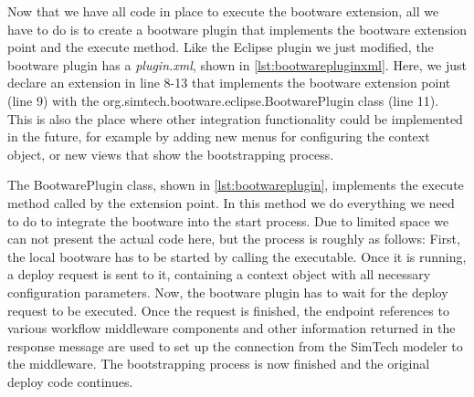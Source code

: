 
Now that we have all code in place to execute the bootware extension, all we have to do is to create a bootware plugin that implements the bootware extension point and the execute method.
Like the Eclipse plugin we just modified, the bootware plugin has a \textit{plugin.xml}, shown in \autoref{lst:bootwarepluginxml}.
Here, we just declare an extension in line 8-13 that implements the bootware extension point (line 9) with the org.simtech.bootware.eclipse.BootwarePlugin class (line 11).
This is also the place where other integration functionality could be implemented in the future, for example by adding new menus for configuring the context object, or new views that show the bootstrapping process.

\vspace*{\baselineskip}

The BootwarePlugin class, shown in \autoref{lst:bootwareplugin}, implements the execute method called by the extension point.
In this method we do everything we need to do to integrate the bootware into the start process.
Due to limited space we can not present the actual code here, but the process is roughly as follows:
First, the local bootware has to be started by calling the executable.
Once it is running, a deploy request is sent to it, containing a context object with all necessary configuration parameters.
Now, the bootware plugin has to wait for the deploy request to be executed.
Once the request is finished, the endpoint references to various workflow middleware components and other information returned in the response message are used to set up the connection from the SimTech modeler to the middleware.
The bootstrapping process is now finished and the original deploy code continues.

\vspace*{\baselineskip}
